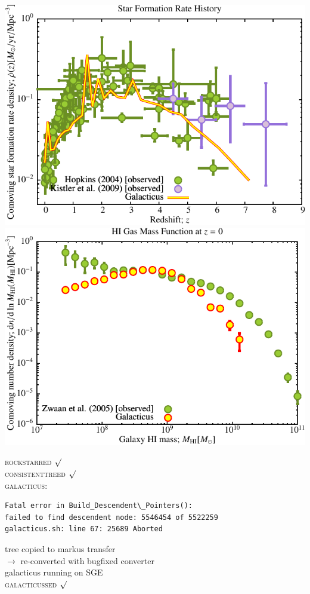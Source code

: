 \documentclass[a4paper,11pt,fleqn,oneside]{book}
\begin{document}
\includegraphics[scale=0.6]{drd5_r256/Star_Formation_History.pdf}
\includegraphics[scale=0.6]{drd5_r256/HI_Gas_Mass_Function.pdf}

\textsc{rockstarred} $\surd$ \\ \textsc{consistenttreed} $\surd$  \\ \textsc{galacticus}: 
\begin{verbatim}
Fatal error in Build_Descendent\_Pointers():
failed to find descendent node: 5546454 of 5522259
galacticus.sh: line 67: 25689 Aborted  
\end{verbatim}
tree copied to markus transfer \\
$\rightarrow$ re-converted with bugfixed converter \\
galacticus running on SGE \\
\textsc{galacticussed} $\surd$ 
\end{document}
